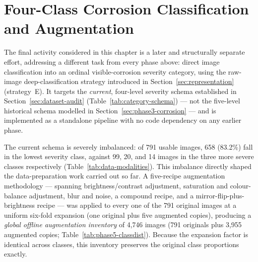 \section{Four-Class Corrosion Classification and Augmentation}
\label{sec:phase5}

The final activity considered in this chapter is a later and structurally
separate effort, addressing a different task from every phase above: direct
image classification into an ordinal visible-corrosion severity category,
using the raw-image deep-classification strategy introduced in
Section~\ref{sec:representation} (strategy~E). It targets the
\emph{current}, four-level severity schema established in
Section~\ref{sec:dataset-audit} (Table~\ref{tab:category-schema}) — not the
five-level historical schema modelled in
Section~\ref{sec:phase3-corrosion} — and is implemented as a standalone
pipeline with no code dependency on any earlier phase.

The current schema is severely imbalanced: of 791 usable images, 658
(83.2\%) fall in the lowest severity class, against 99, 20, and 14 images
in the three more severe classes respectively (Table~\ref{tab:data-modalities}).
This imbalance directly shaped the data-preparation work carried out so
far. A five-recipe augmentation methodology — spanning brightness/contrast
adjustment, saturation and colour-balance adjustment, blur and noise, a
compound recipe, and a mirror-flip-plus-brightness recipe — was applied to
every one of the 791 original images at a uniform six-fold expansion (one
original plus five augmented copies), producing a \emph{global offline
augmentation inventory} of 4{,}746 images (791 originals plus 3{,}955
augmented copies; Table~\ref{tab:phase5-classdist}). Because the expansion
factor is identical across classes, this inventory preserves the original
class proportions exactly.


